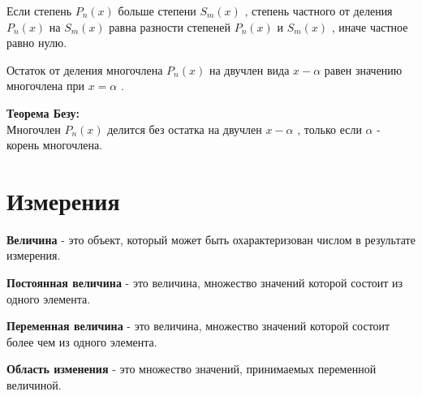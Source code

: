 \documentclass[oneside]{book}
\begin{document}
	Если
	степень
	\begin{math}
		P_n(x)
	\end{math}
	больше степени
	\begin{math}
		S_m(x)
	\end{math}
	, степень частного от деления
	\begin{math}
		P_n(x)
	\end{math}
	на
	\begin{math}
		S_m(x)
	\end{math}
	равна разности степеней
	\begin{math}
		P_n(x)
	\end{math}
	и
	\begin{math}
		S_m(x)
	\end{math}
	, иначе частное равно нулю.

	Остаток от деления многочлена
	\begin{math}
		P_n(x)
	\end{math}
	на двучлен вида
	\begin{math}
		x - \alpha 
	\end{math}
	равен значению многочлена при
	\begin{math}
		x = \alpha 
	\end{math}
	.

	\textbf{Теорема Безу:}
	\\
	Многочлен
	\begin{math}
		P_n(x)
	\end{math}
	делится без остатка на двучлен
	\begin{math}
		x - \alpha
	\end{math}
	, только если
	\begin{math}
		\alpha 
	\end{math}
	- корень многочлена.

	\chapter{Измерения}
	\textbf{Величина} - это
	объект, который может быть охарактеризован числом в результате
	измерения.

	\textbf{Постоянная величина} - это
	величина, множество значений которой
	состоит из одного элемента.

	\textbf{Переменная величина} - это
	величина, множество значений которой
	состоит более чем из одного элемента.

	\textbf{Область изменения} - это
	множество значений, принимаемых переменной
	величиной.
	
\end{document}
